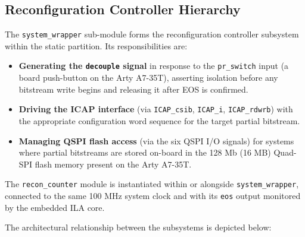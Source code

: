 \subsection{Reconfiguration Controller Hierarchy}

The \texttt{system\_wrapper} sub-module forms the reconfiguration controller subsystem within the static partition. Its responsibilities are:

\begin{itemize}
  \item \textbf{Generating the \texttt{decouple} signal} in response to the \texttt{pr\_switch} input (a board push-button on the Arty A7-35T), asserting isolation before any bitstream write begins and releasing it after EOS is confirmed.
  \item \textbf{Driving the ICAP interface} (via \texttt{ICAP\_csib}, \texttt{ICAP\_i}, \texttt{ICAP\_rdwrb}) with the appropriate configuration word sequence for the target partial bitstream.
  \item \textbf{Managing QSPI flash access} (via the six QSPI I/O signals) for systems where partial bitstreams are stored on-board in the 128 Mb (16 MB) Quad-SPI flash memory present on the Arty A7-35T.
\end{itemize}
The \texttt{recon\_counter} module is instantiated within or alongside \texttt{system\_wrapper}, connected to the same 100 MHz system clock and with its \texttt{eos} output monitored by the embedded ILA core.

The architectural relationship between the subsystems is depicted below:

